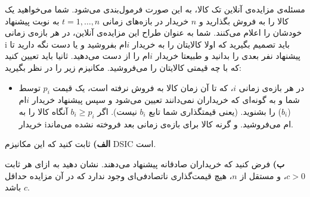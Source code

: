 مسئله‌ی مزایده‌ی آنلاین تک کالا، به این صورت فرمول‌بندی می‌شود. شما می‌خواهید یک کالا را به فروش بگذارید و $n$ خریدار در بازه‌های زمانی
$t = 1, \ldots , n$
به نوبت پیشنهاد خودشان را اعلام می‌کنند. شما به عنوان طراح این مزاید‌ه‌ی آنلاین، در هر بازه‌ی زمانی i باید تصمیم بگیرید که اولا کالایتان را به خریدار $i$ام بفروشید و یا دست نگه دارید تا پیشنهاد نفر بعدی را بدانید و طبیعتا خریدار $i$ام را از دست می‌دهید. ثانیا باید تعیین کنید که با چه قیمتی کالایتان را می‌فروشید. مکانیزم زیر را در نظر بگیرید:
\begin{itemize}
    \item
    در هر بازه‌ی زمانی $i$، که تا آن زمان کالا به فروش نرفته است، یک قیمت $p_i$ توسط شما و به گونه‌ای که خریداران نمی‌دانند تعیین می‌شود و سپس پیشنهاد خریدار $i$ام ($b_i$) را بشنوید. (یعنی قیمتگذاری شما تابع $b_i$ نیست). اگر $b_i \geq p_i$ آنگاه کالا را به خریدار iام می‌فروشید. و گرنه کالا برای بازه‌ی زمانی بعد فروخته نشده می‌ماند.
\end{itemize}

\vspace*{5pt}
\textbf{الف)}
ثابت کنید که این مکانیزم DSIC است.

\vspace*{5pt}
\textbf{ب)}
فرض کنید که خریداران صادقانه پیشنهاد می‌دهند. نشان دهید به ازای هر ثابت  $c > 0$، و مستقل از $n$، هیچ قیمت‌گذاری ناتصادفی‌ای وجود ندارد که در آن
مزایده حداقل $c$ باشد.
